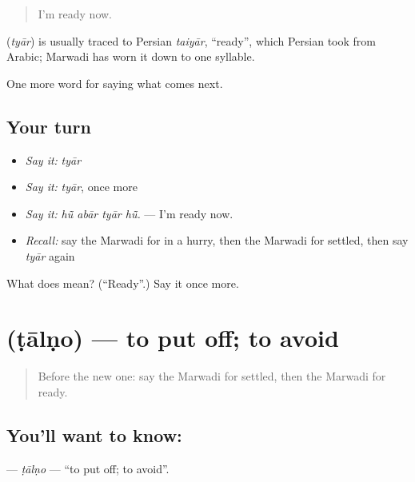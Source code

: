 \begin{quote}
I'm ready now.
\end{quote}

\begin{cousinweb}
\textbf{} (\emph{tyār}) is usually traced to Persian \emph{taiyār}, \textquotedblleft{}ready\textquotedblright{}, which Persian took from Arabic; Marwadi has worn it down to one syllable.
\end{cousinweb}

\begin{grammarlens}[title={What you've built}]
One more word for saying what comes next.
\end{grammarlens}

\subsection*{Your turn}
\begin{itemize}
\raggedright
  \item \emph{Say it:} \emph{tyār}
  \item \emph{Say it:} \emph{tyār}, once more
  \item \emph{Say it:} \emph{hū̃ abār tyār hū̃.} — I'm ready now.
  \item \emph{Recall:} say the Marwadi for in a hurry, then the Marwadi for settled, then say \emph{tyār} again
\end{itemize}

\begin{tcolorbox}[breakable,colback=teal!4,colframe=teal!35!black,title={Before you move on}]
What does  mean? (\textquotedblleft{}Ready\textquotedblright{}.) Say it once more.
\end{tcolorbox}
\section[\texorpdfstring{\mw{टालणो} (ṭālṇo)}{टालणो (ṭālṇo)}]{ (ṭālṇo) — to put off; to avoid}

\label{lesson:MW-C220-taalno}



\begin{quote}
Before the new one: say the Marwadi for settled, then the Marwadi for ready.
\end{quote}

\subsection*{You'll want to know: }
\textbf{} — \emph{ṭālṇo} — \textquotedblleft{}to put off; to avoid\textquotedblright{}.

